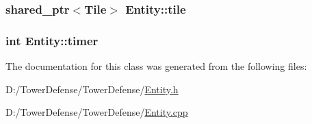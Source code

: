 \hypertarget{class_entity_a2774f1e938416fab37040a33ec573495}{
\subsubsection[{tile}]{\setlength{\rightskip}{0pt plus 5cm}shared\+\_\+ptr$<${\bf Tile}$>$ Entity\+::tile\hspace{0.3cm}{\ttfamily [protected]}}}\label{class_entity_a2774f1e938416fab37040a33ec573495}
\hypertarget{class_entity_abccceab981ceb2c361408358a6ff0585}{
\subsubsection[{timer}]{\setlength{\rightskip}{0pt plus 5cm}int Entity\+::timer\hspace{0.3cm}{\ttfamily [protected]}}}\label{class_entity_abccceab981ceb2c361408358a6ff0585}


The documentation for this class was generated from the following files\+:\begin{DoxyCompactItemize}
\item 
D\+:/\+Tower\+Defense/\+Tower\+Defense/\hyperlink{_entity_8h}{Entity.\+h}\item 
D\+:/\+Tower\+Defense/\+Tower\+Defense/\hyperlink{_entity_8cpp}{Entity.\+cpp}\end{DoxyCompactItemize}
